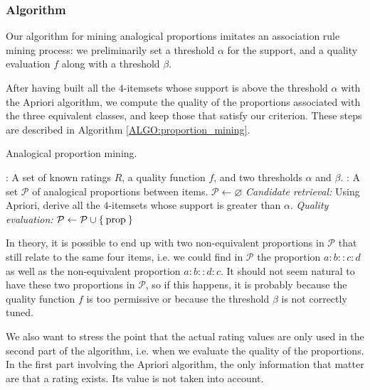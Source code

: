 \subsubsection{Algorithm}

Our algorithm for mining analogical proportions imitates an association rule
mining process: we preliminarily set a threshold $\alpha$ for the support, and a
quality evaluation $f$ along with a threshold $\beta$.

After having built all the $4$-itemsets whose support is above the threshold
$\alpha$ with the Apriori algorithm, we compute the quality of the proportions
associated with the three equivalent classes, and keep those that satisfy our
criterion. These steps are described in Algorithm \ref{ALGO:proportion_mining}.

 \begin{algorithm}[!ht]
   \caption{Analogical proportion mining.}
       \label{ALGO:proportion_mining}
       \begin{algorithmic}

      : A set of known ratings $R$, a quality function $f$,
         and two thresholds $\alpha$ and $\beta$.
         : A set $\mathcal{P}$ of analogical proportions
         between items.
         \STATE $\mathcal{P} \leftarrow \varnothing$
         \STATE \textit{Candidate retrieval:}
      \STATE Using Apriori, derive all the $4$-itemsets whose support is
         greater than $\alpha$.
         \STATE \textit{Quality evaluation:}
         \STATE $\mathcal{P} \leftarrow \mathcal{P} \cup \Set{\text{prop}}$
         \ENDIF
         \ENDFOR
         \ENDFOR
\end{algorithmic}
\end{algorithm}

In theory, it is possible to end up with two non-equivalent proportions in
$\mathcal{P}$ that still relate to the same four items, i.e. we could find in
$\mathcal{P}$ the proportion $a:b::c:d$ as well as the non-equivalent
proportion $a:b::d:c$. It should not seem natural to have these two proportions
in $\mathcal{P}$, so if this happens, it is probably because the quality
function $f$ is too permissive or because the threshold $\beta$ is not
correctly tuned.

We also want to stress the point that the actual rating values are only used in
the second part of the algorithm, i.e. when we evaluate the quality of the
proportions. In the first part involving the Apriori algorithm, the only
information that matter are that a rating exists. Its value is not taken into
account.

